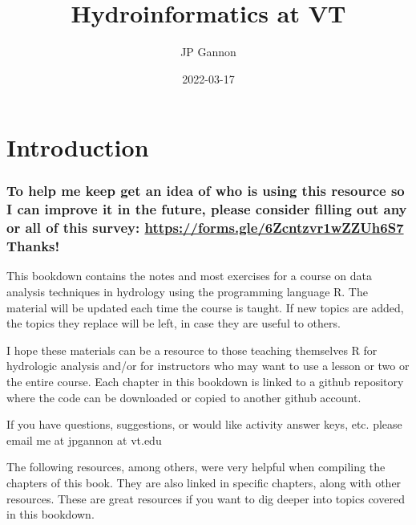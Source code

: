 \documentclass[
]{book}
\title{Hydroinformatics at VT}
\author{JP Gannon}
\date{2022-03-17}
\begin{document}
\maketitle

{
\setcounter{tocdepth}{1}
\tableofcontents
}
\hypertarget{introduction}{%
\chapter{Introduction}\label{introduction}}

\hypertarget{to-help-me-keep-get-an-idea-of-who-is-using-this-resource-so-i-can-improve-it-in-the-future-please-consider-filling-out-any-or-all-of-this-survey-httpsforms.gle6zcntzvr1wzzuh6s7-thanks}{%
\subsection{\texorpdfstring{To help me keep get an idea of who is using this resource so I can improve it in the future, please consider filling out any or all of this survey: \url{https://forms.gle/6Zcntzvr1wZZUh6S7} Thanks!}{To help me keep get an idea of who is using this resource so I can improve it in the future, please consider filling out any or all of this survey: https://forms.gle/6Zcntzvr1wZZUh6S7 Thanks!}}\label{to-help-me-keep-get-an-idea-of-who-is-using-this-resource-so-i-can-improve-it-in-the-future-please-consider-filling-out-any-or-all-of-this-survey-httpsforms.gle6zcntzvr1wzzuh6s7-thanks}}

This bookdown contains the notes and most exercises for a course on data analysis techniques in hydrology using the programming language R. The material will be updated each time the course is taught. If new topics are added, the topics they replace will be left, in case they are useful to others.

I hope these materials can be a resource to those teaching themselves R for hydrologic analysis and/or for instructors who may want to use a lesson or two or the entire course. Each chapter in this bookdown is linked to a github repository where the code can be downloaded or copied to another github account.

If you have questions, suggestions, or would like activity answer keys, etc. please email me at jpgannon at vt.edu

The following resources, among others, were very helpful when compiling the chapters of this book. They are also linked in specific chapters, along with other resources. These are great resources if you want to dig deeper into topics covered in this bookdown.
\end{document}
